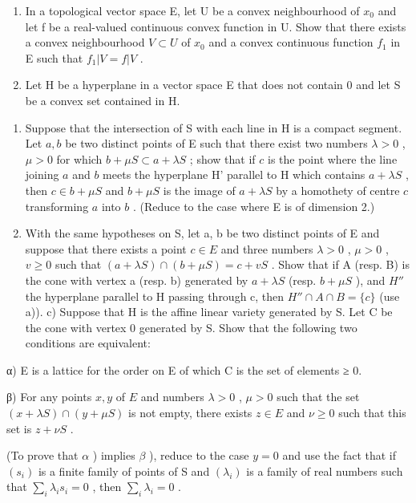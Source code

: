 \begin{enumerate}
\def\labelenumi{\arabic{enumi})}
\setcounter{enumi}{39}
\item
  In a topological vector space E, let U be a convex neighbourhood of \(x_{0}\) and let f be a real-valued continuous convex function in U. Show that there exists a convex neighbourhood \(V \subset U\) of \(x_{0}\) and a convex continuous function \(f_{1}\) in E such that \(f_{1}|V = f|V\) .
\item
  Let H be a hyperplane in a vector space E that does not contain 0 and let S be a convex set contained in H.
\end{enumerate}

\begin{enumerate}
\def\labelenumi{\alph{enumi})}
\item
  Suppose that the intersection of S with each line in H is a compact segment. Let \(a, b\) be two distinct points of E such that there exist two numbers \(\lambda > 0\) , \(\mu > 0\) for which \(b + \mu S \subset a + \lambda S\) ; show that if \(c\) is the point where the line joining \(a\) and \(b\) meets the hyperplane H' parallel to H which contains \(a + \lambda S\) , then \(c \in b + \mu S\) and \(b + \mu S\) is the image of \(a + \lambda S\) by a homothety of centre \(c\) transforming \(a\) into \(b\) . (Reduce to the case where E is of dimension 2.)
\item
  With the same hypotheses on S, let a, b be two distinct points of E and suppose that there exists a point \(c \in E\) and three numbers \(\lambda > 0\) , \(\mu > 0\) , \(v \geqslant 0\) such that \((a + \lambda S) \cap (b + \mu S) = c + vS\) . Show that if A (resp. B) is the cone with vertex a (resp. b) generated by \(a + \lambda S\) (resp. \(b + \mu S\) ), and \(H''\) the hyperplane parallel to H passing through c, then \(H'' \cap A \cap B = \{c\}\) (use a)). c) Suppose that H is the affine linear variety generated by S. Let C be the cone with vertex 0 generated by S. Show that the following two conditions are equivalent:
\end{enumerate}

α) E is a lattice for the order on E of which C is the set of elements ≥ 0.

β) For any points \(x, y\) of \(E\) and numbers \(\lambda > 0\) , \(\mu > 0\) such that the set \((x + \lambda S) \cap (y + \mu S)\) is not empty, there exists \(z \in E\) and \(\nu \geqslant 0\) such that this set is \(z + \nu S\) .

(To prove that \(\alpha\) ) implies \(\beta\) ), reduce to the case \(y = 0\) and use the fact that if \((s_i)\) is a finite family of points of S and \((\lambda_i)\) is a family of real numbers such that \(\sum_{i} \lambda_i s_i = 0\) , then \(\sum_{i} \lambda_i = 0\) .

